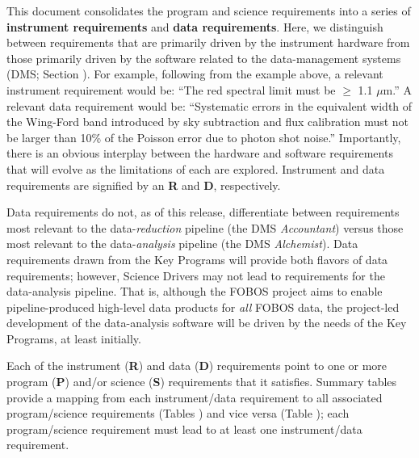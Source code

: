 \documentclass[11pt,a4paper,twoside,onecolumn,openany,final,oldfontcommands]{memoir}
\begin{document}
This document consolidates the program and science requirements into a series of \textbf{instrument requirements} and \textbf{data requirements}.  Here, we distinguish between requirements that are primarily driven by the instrument hardware from those primarily driven by the software related to the data-management systems (DMS; Section ).    For example, following from the example above, a relevant instrument requirement would be: ``The red spectral limit must be $\geq$ 1.1 $\mu$m.''  A relevant data requirement would be: ``Systematic errors in the equivalent width of the Wing-Ford band introduced by sky subtraction and flux calibration must not be larger than 10\% of the Poisson error due to photon shot noise.''  Importantly, there is an obvious interplay between the hardware and software requirements that will evolve as the limitations of each are explored. Instrument and data requirements are signified by an \textbf{R} and \textbf{D}, respectively.

Data requirements do not, as of this release, differentiate between requirements most relevant to the data-\textit{reduction} pipeline (the DMS \textit{Accountant}) versus those most relevant to the data-\textit{analysis} pipeline (the DMS \textit{Alchemist}).  Data requirements drawn from the Key Programs will provide both flavors of data requirements; however, Science Drivers may not lead to requirements for the data-analysis pipeline.  That is, although the FOBOS project aims to enable pipeline-produced high-level data products for \textit{all} FOBOS data, the project-led development of the data-analysis software will be driven by the needs of the Key Programs, at least initially.

Each of the instrument (\textbf{R}) and data (\textbf{D}) requirements point to one or more program (\textbf{P}) and/or science (\textbf{S}) requirements that it satisfies.  Summary tables provide a mapping from each instrument/data requirement to all associated program/science requirements (Tables ) and vice versa (Table ); each program/science requirement must lead to at least one instrument/data requirement.

\end{document}
